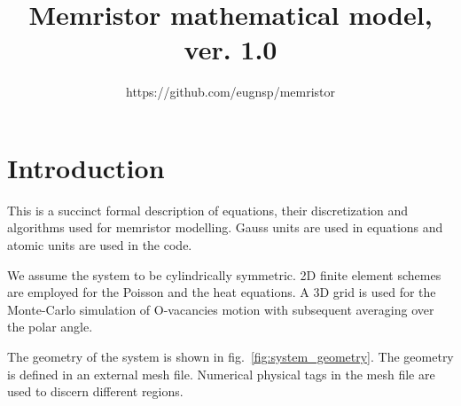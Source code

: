 \documentclass[10pt]{article}
\begin{document}
\title{Memristor mathematical model, ver. 1.0}
\author{https://github.com/eugnsp/memristor}
\maketitle
\tableofcontents

\section{Introduction}

This is a succinct formal description of equations, their discretization and
algorithms used for memristor modelling. Gauss units are used in equations and
atomic units are used in the code.

We assume the system to be cylindrically symmetric. 2D finite element schemes
are employed for the Poisson and the heat equations. A 3D grid is used for
the Monte-Carlo simulation of O-vacancies motion with subsequent averaging
over the polar angle.

The geometry of the system is shown in fig.~\ref{fig:system_geometry}. The
geometry is defined in an external mesh file. Numerical physical tags in the mesh
file are used to discern different regions.
\end{document}
